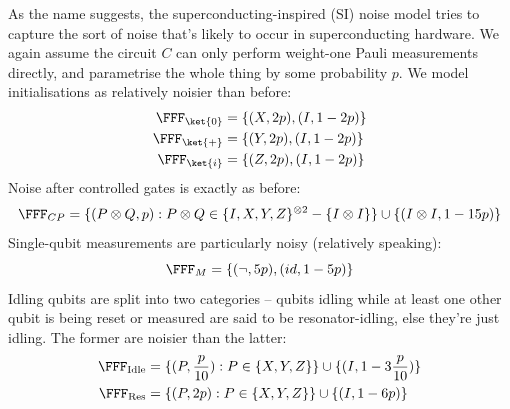 \begin{example}
    As the name suggests, the superconducting-inspired (SI) noise model tries to capture the sort of noise that's likely to occur in superconducting hardware.
    We again assume the circuit $C$ can only perform weight-one Pauli measurements directly, and parametrise the whole thing by some probability $p$.
    We model initialisations as relatively noisier than before:
    \begin{equation}
        \begin{aligned}
            \FFF_{\ket{0}} &= \{(X, 2p), (I, 1-2p)\}\\
            \FFF_{\ket{+}} &= \{(Y, 2p), (I, 1-2p)\}\\
            \FFF_{\ket{i}} &= \{(Z, 2p), (I, 1-2p)\}
        \end{aligned}
    \end{equation}
    Noise after controlled gates is exactly as before:
    \begin{equation}
        \FFF_{CP} = \{(P \otimes Q, p) : P \otimes Q \in \{I, X, Y, Z\}^{\otimes 2} - \{I \otimes I\}\} \cup \{(I \otimes I, 1-15p)\}
    \end{equation}
    Single-qubit measurements are particularly noisy (relatively speaking):
    \begin{equation}
        \FFF_M = \{(\neg, 5p), (id, 1-5p)\}
    \end{equation}
    Idling qubits are split into two categories -- qubits idling while at least one other qubit is being reset or measured are said to be resonator-idling, else they're just idling.
    The former are noisier than the latter:
    \begin{equation}
        \begin{aligned}
            \FFF_{\text{Idle}} &= \{(P, \frac{p}{10}) : P \in \{X, Y, Z\}\} \cup \{(I, 1 - 3\frac{p}{10})\}\\
            \FFF_{\text{Res}} &= \{(P, 2p) : P \in \{X, Y, Z\}\} \cup \{(I, 1 - 6p)\}
        \end{aligned}
    \end{equation}
\end{example}

